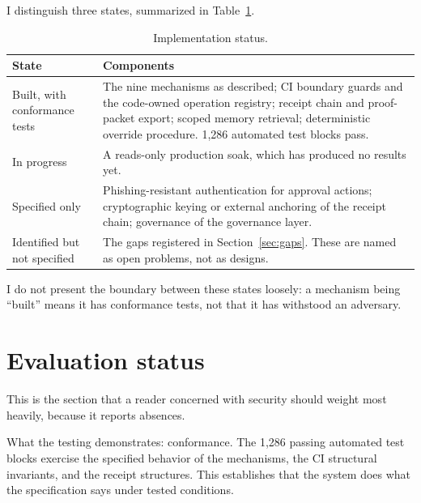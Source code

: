 \documentclass[11pt,letterpaper]{article}
\begin{document}
I distinguish three states, summarized in Table~\ref{tab:status}.

\begin{table}[htbp]
\centering
\small
\caption{Implementation status.}
\label{tab:status}
\begin{tabular}{@{}p{3.4cm}p{10.9cm}@{}}
\toprule
\textbf{State} & \textbf{Components} \\
\midrule
Built, with conformance tests & The nine mechanisms as described; CI boundary guards and the code-owned operation registry; receipt chain and proof-packet export; scoped memory retrieval; deterministic override procedure. 1,286 automated test blocks pass. \\
In progress & A reads-only production soak, which has produced no results yet. \\
Specified only & Phishing-resistant authentication for approval actions; cryptographic keying or external anchoring of the receipt chain; governance of the governance layer. \\
Identified but not specified & The gaps registered in Section~\ref{sec:gaps}. These are named as open problems, not as designs. \\
\bottomrule
\end{tabular}
\end{table}

I do not present the boundary between these states loosely: a mechanism being ``built'' means it has conformance tests, not that it has withstood an adversary.

\section{Evaluation status}\label{sec:evaluation}

This is the section that a reader concerned with security should weight most heavily, because it reports absences.

What the testing demonstrates: conformance. The 1,286 passing automated test blocks exercise the specified behavior of the mechanisms, the CI structural invariants, and the receipt structures. This establishes that the system does what the specification says under tested conditions.
\end{document}
